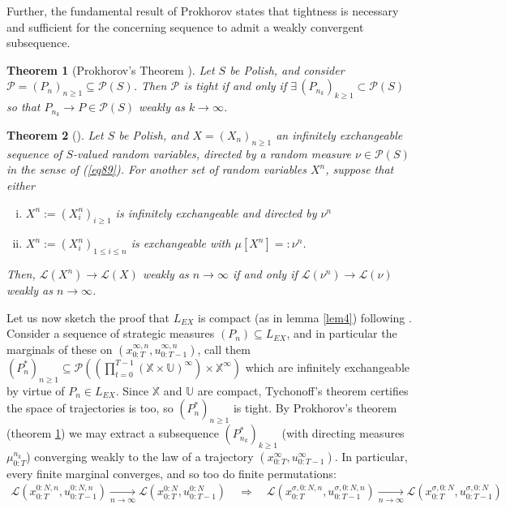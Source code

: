 \documentclass[12pt, oneside]{report}
\newcommand{\mbb}[1]{\mathbb{#1}}
\newcommand{\1}[1]{\mathbbm{1}_{\{#1\}}}
\newcommand{\mc}[1]{\mathcal{#1}}
\newtheorem{theorem}{Theorem}[section]
\theoremstyle{definition}
\begin{document}
Further, the fundamental result of Prokhorov \cite[theorem 1.12]{Prokhorov_1956} states that tightness is necessary and sufficient for the concerning sequence to admit a weakly convergent subsequence. 
\begin{theorem}[Prokhorov's Theorem {\cite[theorem 1.12]{Prokhorov_1956}}]\label{thm8}
    Let $S$ be Polish, and consider $\mc{P}=(P_n)_{n\geq 1}\subseteq\mc{P}(S)$. Then $\mc{P}$ is tight if and only if $\exists\,(P_{n_k})_{k\geq 1}\subset\mc{P}(S)$ so that $P_{n_k}\rightarrow P\in\mc{P}(S)$ weakly as $k\rightarrow\infty$.
\end{theorem}
\begin{theorem}[{\cite[proposition 7.20]{Aldous_Ibragimov_1985}}]\label{thm9}
    Let $S$ be Polish, and $X=(X_n)_{n\geq 1}$ an infinitely exchangeable sequence of $S$-valued random variables, directed by a random measure $\nu\in\mc{P}(S)$ in the sense of (\ref{eq89}).  
    For another set of random variables $X^n$, suppose that either
    \begin{enumerate}[(i)]
        \item $X^n:=(X^n_i)_{i\geq 1}$ is infinitely exchangeable and directed by $\nu^n$
        \item $X^n:=(X^n_i)_{1\leq i\leq n}$ is exchangeable with $\mu[X^n]=:\nu^n$.
    \end{enumerate}
    Then, $\mc{L}(X^n)\rightarrow \mc{L}(X)$ weakly as $n\rightarrow\infty$ if and only if $\mc{L}(\nu^n)\rightarrow\mc{L}(\nu)$ weakly as $n\rightarrow\infty$.
\end{theorem}
Let us now sketch the proof that $L_{EX}$ is compact (as in lemma \ref{lem4}) following \cite[appendix D]{Sanjari_Saldi_Yüksel_2024}. Consider a sequence of strategic measures $(P_n)\subseteq L_{EX}$, and in particular
the marginals of these on $(x^{\infty,n}_{0:T},u^{\infty,n}_{0:T-1})$, call them $(P^\ast_n)_{n\geq 1}\subseteq\mc{P}((\prod_{t=0}^{T-1}(\mbb{X}\times\mbb{U})^\infty)\times\mbb{X}^\infty)$ which are infinitely exchangeable by virtue of $P_n\in L_{EX}$. 
Since $\mbb{X}$ and $\mbb{U}$ are compact, Tychonoff's theorem certifies the space of trajectories is too, so $(P^\ast_n)_{n\geq 1}$ is tight. By Prokhorov's theorem (theorem \ref{thm8}) we may extract a subsequence $(P^\ast_{n_k})_{k\geq 1}$ (with directing measures $\mu^{n_k}_{0:T}$) converging
weakly to the law of a trajectory $(x^\infty_{0:T},u^\infty_{0:T-1})$. In particular, every finite marginal converges, and so too do finite permutations:
\begin{align}
    \mc{L}(x^{0:N,n}_{0:T},u^{0:N,n}_{0:T-1})\underset{n\rightarrow\infty}{\longrightarrow}\mc{L}(x^{0:N}_{0:T},u^{0:N}_{0:T-1})\quad\Rightarrow\quad \mc{L}(x^{\sigma,0:N,n}_{0:T},u^{\sigma,0:N,n}_{0:T-1})\underset{n\rightarrow\infty}{\longrightarrow}\mc{L}(x^{\sigma,0:N}_{0:T},u^{\sigma,0:N}_{0:T-1})\label{eq90}
\end{align} 
\end{document}
